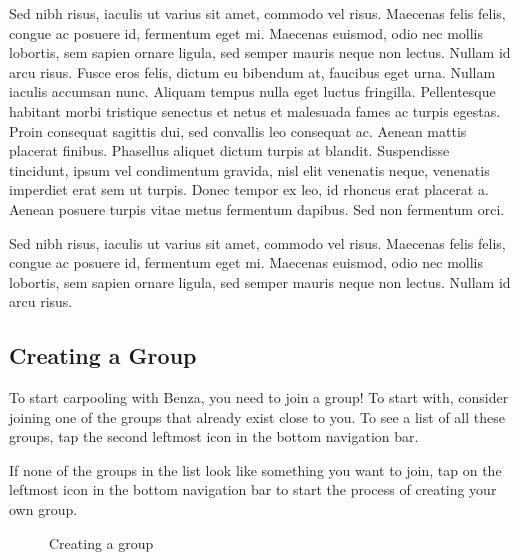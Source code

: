 \documentclass{article}
\begin{document}
    Sed nibh risus, iaculis ut varius sit amet, commodo vel risus. Maecenas felis felis, congue ac posuere id, fermentum eget mi. Maecenas euismod, odio nec mollis lobortis, sem sapien ornare ligula, sed semper mauris neque non lectus. Nullam id arcu risus. Fusce eros felis, dictum eu bibendum at, faucibus eget urna. Nullam iaculis accumsan nunc. Aliquam tempus nulla eget luctus fringilla. Pellentesque habitant morbi tristique senectus et netus et malesuada fames ac turpis egestas. Proin consequat sagittis dui, sed convallis leo consequat ac. Aenean mattis placerat finibus. Phasellus aliquet dictum turpis at blandit. Suspendisse tincidunt, ipsum vel condimentum gravida, nisl elit venenatis neque, venenatis imperdiet erat sem ut turpis. Donec tempor ex leo, id rhoncus erat placerat a. Aenean posuere turpis vitae metus fermentum dapibus. Sed non fermentum orci. \par
    
     Sed nibh risus, iaculis ut varius sit amet, commodo vel risus. Maecenas felis felis, congue ac posuere id, fermentum eget mi. Maecenas euismod, odio nec mollis lobortis, sem sapien ornare ligula, sed semper mauris neque non lectus. Nullam id arcu risus. \par
    
    \newpage
    \subsection{Creating a Group}
    
    To start carpooling with Benza, you need to join a group! To start with, consider joining one of the groups that already exist close to you. To see a list of all these groups, tap the second leftmost icon in the bottom navigation bar. \par
    If none of the groups in the list look like something you want to join, tap on the leftmost icon in the bottom navigation bar to start the process of creating your own group. \par
    
    \begin{figure}[ht]
    \caption{Creating a group}
    \end{figure}
    
\end{document}
